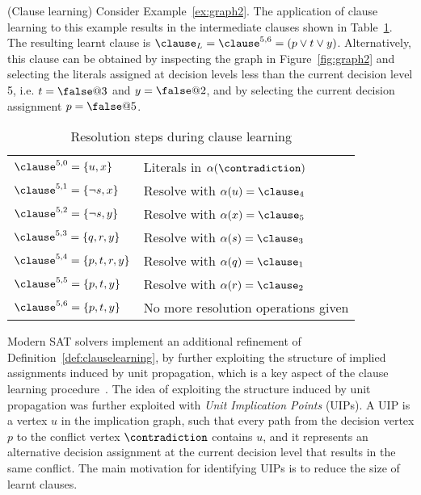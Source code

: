 \begin{example}%
\label{ex:cl}
    (Clause learning)
    Consider Example~\ref{ex:graph2}. The application of clause learning to this
    example results in the intermediate clauses shown in Table~\ref{tab:cl}. The
    resulting learnt clause is $\clause_L = \clause^{5,6} = (p \lor t \lor y)$.
    Alternatively, this clause can be obtained by inspecting the graph in
    Figure~\ref{fig:graph2} and selecting the literals assigned at decision
    levels less than the current decision level 5, i.e. $t = \false @3$ and $y =
    \false @ 2$, and by selecting the current decision assignment $p = \false
    @5$.
\end{example}

\begin{table}%
\centering
\caption{Resolution steps during clause learning}
    \begin{tabular}{ll}
        \toprule
        $\clause^{5,0} = \{ u, x\}$ & Literals in $\alpha(\contradiction)$ \\
        $\clause^{5,1} = \{ \neg s, x\}$ & Resolve with $\alpha(u) = \clause_4$ \\
        $\clause^{5,2} = \{ \neg s, y\}$ & Resolve with $\alpha(x) = \clause_5$ \\
        $\clause^{5,3} = \{ q, r, y\}$ & Resolve with $\alpha(s) = \clause_3$ \\
        $\clause^{5,4} = \{ p, t, r, y\}$ & Resolve with $\alpha(q) = \clause_1$ \\
        $\clause^{5,5} = \{ p, t, y\}$ & Resolve with $\alpha(r) = \clause_2$ \\
        $\clause^{5,6} = \{ p, t, y\}$ & No more resolution operations given \\
        \toprule
    \end{tabular}%
\label{tab:cl}
\end{table}

Modern SAT solvers implement an additional refinement of
Definition~\ref{def:clauselearning}, by further exploiting the structure of
implied assignments induced by unit propagation, which is a key aspect of the
clause learning procedure~\cite{silva1997grasp}. The idea of exploiting the
structure induced by unit propagation was further exploited with \emph{Unit
Implication Points} (UIPs). A UIP is a vertex $u$ in the implication graph, such
that every path from the decision vertex $p$ to the conflict vertex $\contradiction$
contains $u$, and it represents an alternative decision assignment at the
current decision level that results in the same conflict. The main motivation
for identifying UIPs is to reduce the size of learnt clauses. 

